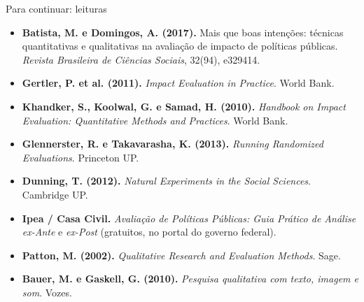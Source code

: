 \begin{frame}{Para continuar: leituras}
  \small
  \begin{itemize}
    \item \textbf{Batista, M. e Domingos, A. (2017).} Mais que boas intenções: técnicas quantitativas e qualitativas na avaliação de impacto de políticas públicas. \emph{Revista Brasileira de Ciências Sociais}, 32(94), e329414. 
    \item \textbf{Gertler, P. et al. (2011).} \emph{Impact Evaluation in Practice}. World Bank.
    \item \textbf{Khandker, S., Koolwal, G. e Samad, H. (2010).} \emph{Handbook on Impact Evaluation: Quantitative Methods and Practices}. World Bank.
    \item \textbf{Glennerster, R. e Takavarasha, K. (2013).} \emph{Running Randomized Evaluations}. Princeton UP.
    \item \textbf{Dunning, T. (2012).} \emph{Natural Experiments in the Social Sciences}. Cambridge UP.
    \item \textbf{Ipea / Casa Civil.} \emph{Avaliação de Políticas Públicas: Guia Prático de Análise ex-Ante} e \emph{ex-Post} (gratuitos, no portal do governo federal).
    \item \textbf{Patton, M. (2002).} \emph{Qualitative Research and Evaluation Methods}. Sage.
    \item \textbf{Bauer, M. e Gaskell, G. (2010).} \emph{Pesquisa qualitativa com texto, imagem e som}. Vozes.
  \end{itemize}
\end{frame}

